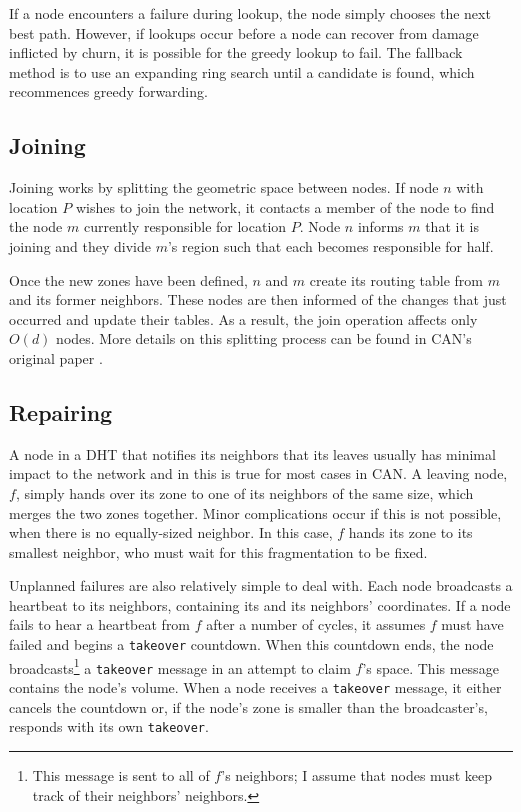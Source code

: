 If a node encounters a failure during lookup, the node simply chooses the next best path.
However, if lookups occur before a node can recover from damage inflicted by churn, it is possible for the greedy lookup to fail.
The fallback method is to use an expanding ring search until a candidate is found, which recommences greedy forwarding.

\subsection*{Joining}
Joining works by splitting the geometric space between nodes.  
If node $n$ with location $P$ wishes to join the network, it contacts a member of the node to find the node $m$ currently responsible for location $P$.
Node $n$ informs $m$ that it is joining and they divide $m$'s region such that each becomes responsible for half.

Once the new zones have been defined, $n$ and $m$ create its routing table from $m$ and its former neighbors.
These nodes are then informed of the changes that just occurred and update their tables.
As a result, the join operation affects only $O(d)$ nodes.  
More details on this splitting process can be found in CAN's original paper \cite{can}.

\subsection*{Repairing}
A node in a DHT that notifies its neighbors that its leaves usually has minimal impact to the  network and in this is true for most cases in CAN.
A leaving node, $f$, simply hands over its zone to one of its neighbors of the same size, which merges the two zones together.
Minor complications occur if this is not possible, when there is no equally-sized neighbor. 
In this case, $f$ hands its zone to its smallest neighbor, who must wait for this fragmentation to be fixed.



Unplanned failures are also relatively simple to deal with.
Each node broadcasts a heartbeat to its neighbors, containing its and its neighbors' coordinates.
If a node fails to hear a heartbeat from $f$ after a number of cycles, it assumes $f$ must have failed and begins a \texttt{takeover} countdown.
When this countdown ends, the node broadcasts\footnote{This message is sent to all of $f$'s neighbors;  I assume that nodes must keep track of their neighbors' neighbors.} a \texttt{takeover} message in an attempt to claim $f$'s space.
This message contains the node's volume.
When a node receives a \texttt{takeover} message, it either cancels the countdown or, if the node's zone is smaller than the broadcaster's, responds with its own \texttt{takeover}.

